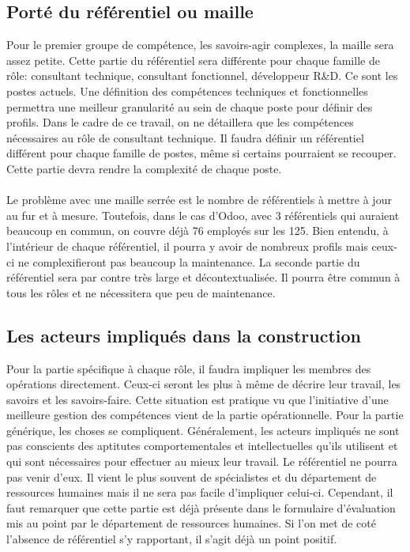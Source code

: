 \subsection{Porté du référentiel ou maille}
Pour le premier groupe de compétence, les savoirs-agir complexes, la maille sera assez petite. Cette partie du référentiel sera différente pour chaque famille de rôle: consultant technique, consultant fonctionnel, développeur R\&D. Ce sont les postes actuels. Une définition des compétences techniques et fonctionnelles permettra une meilleur granularité au sein de chaque poste pour définir des profils. Dans le cadre de ce travail, on ne détaillera que les compétences nécessaires au rôle de consultant technique. Il faudra définir un référentiel différent pour chaque famille de postes, même si certains pourraient se recouper. Cette partie devra rendre la complexité de chaque poste. 

\paragraph{}Le problème avec une maille serrée est le nombre de référentiels à mettre à jour au fur et à mesure.
 Toutefois, dans le cas d'Odoo, avec 3 référentiels qui auraient beaucoup en commun, on couvre déjà 76 employés sur les 125. Bien entendu, à l'intérieur de chaque référentiel, il pourra y avoir de nombreux profils mais ceux-ci ne complexifieront pas beaucoup la maintenance. La seconde partie du référentiel sera par contre très large et décontextualisée. Il pourra être commun à tous les rôles et ne nécessitera que peu de maintenance. 

\subsection{Les acteurs impliqués dans la construction}
Pour la partie spécifique à chaque rôle, il faudra impliquer les membres des opérations directement. Ceux-ci seront les plus à même de décrire leur travail, les savoirs et les savoirs-faire. Cette situation est pratique vu que l'initiative d'une meilleure gestion des compétences vient de la partie opérationnelle. Pour la partie générique, les choses se compliquent. Généralement, les acteurs impliqués ne sont pas conscients des aptitutes comportementales et intellectuelles qu'ils utilisent et qui sont nécessaires pour effectuer au mieux leur travail. Le référentiel ne pourra pas venir d'eux. Il vient le plus souvent de spécialistes et du département de ressources humaines mais il ne sera pas facile d'impliquer celui-ci. Cependant, il faut remarquer que cette partie est déjà présente dans le formulaire d'évaluation mis au point par le département de ressources humaines. Si l'on met de coté l'absence de référentiel s'y rapportant, il s'agit déjà un point positif.



